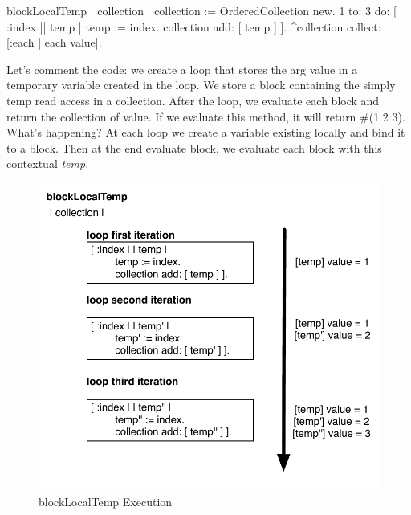 \documentclass[a4paper,10pt,twoside]{book}
\begin{document}
\begin{code}{}
blockLocalTemp
	| collection |
		collection := OrderedCollection new.
		1 to: 3 do: [ :index || temp |
			temp := index.
			collection add: [ temp ] ].
		^collection collect: [:each | each value].
\end{code}

Let's comment the code: we create a loop that stores the arg value in a temporary variable created in the loop. We store a block containing the simply temp read access in a collection. After the loop, we evaluate each block and return the collection of value.
If we evaluate this method, it will return \#(1 2 3). What's happening? At each loop we create a variable existing locally and bind it to a block. Then at the end evaluate block, we evaluate each block with this contextual \emph{temp}.

\begin{figure}[htbp]
	\centering
        \includegraphics[width=0.7\linewidth]{blockClosureLocalTemp}
	\caption{blockLocalTemp Execution}
	\label{fig:blockLocalTempExecution}
\end{figure}
\end{document}
